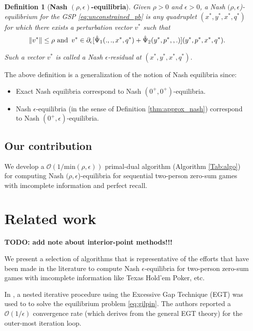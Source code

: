 \documentclass{article} %
\newtheorem{definition}[theorem]{Definition}
\begin{document}
\begin{definition}[\textbf{Nash $(\rho,\epsilon)$-equilibria}]
Given $\rho > 0$ and $\epsilon > 0$, a Nash
$(\rho,\epsilon$)-equilibrium for the GSP \eqref{eq:unconstrained_pb}
is any quadruplet $(x^*, y^*, x^*, q^*)$ for which
there exists a perturbation vector $v^*$ such that
\begin{eqnarray}
\|v^*\| \le \rho \text{ and}\hspace{.5em} v^* \in
\partial_\epsilon[\hat{\Psi}_1(., ., x^*, q^*) +
  \hat{\Psi}_2(y^*, p^*, , .)](y^*,p^*,x^*,q^*).
\end{eqnarray}

Such a vector $v^*$ is called a Nash $\epsilon$-residual at $(x^*,
y^*, x^*, q^*)$.
\label{thm:cool_notion}
\end{definition}


The above definition is a generalization of the notion of Nash
equilibria since:
\begin{itemize}
\item Exact Nash equilibria correspond to Nash $(0^+,0^+)$-equilibria.
\item Nash $\epsilon$-equilibria (in the sense of Definition
  \ref{thm:approx_nash}) correspond to Nash $(0^+,\epsilon)$-equilibria.
\end{itemize}

\subsection{Our contribution}
We develop a $\mathcal{O}(1/\text{min}(\rho,\epsilon))$ primal-dual
algorithm (Algorithm \ref{Tab:algo}) for computing Nash $(\rho,
  \epsilon$)-equilibria for sequential two-person zero-sum games with
  imcomplete information and perfect recall.

\section{Related work}
\label{sec:related_work}
\textbf{TODO: add note about interior-point methods!!!}

We present a selection of algorithms that is representative of the
efforts that have been made in the literature to compute Nash
$\epsilon$-equilibria for two-person zero-sum games with imcomplete
information like Texas Hold'em Poker, etc.


In \cite{hoda2010smoothing}, a nested iterative procedure using the
Excessive Gap Technique (EGT) \cite{nesterov2005excessive} was used to
to solve the equilibrium problem \eqref{eq:gilpin}.
The authors reported a $\mathcal{O}(1/\epsilon)$ convergence rate
(which derives from the general EGT theory) for the outer-most
iteration loop.
\end{document}
